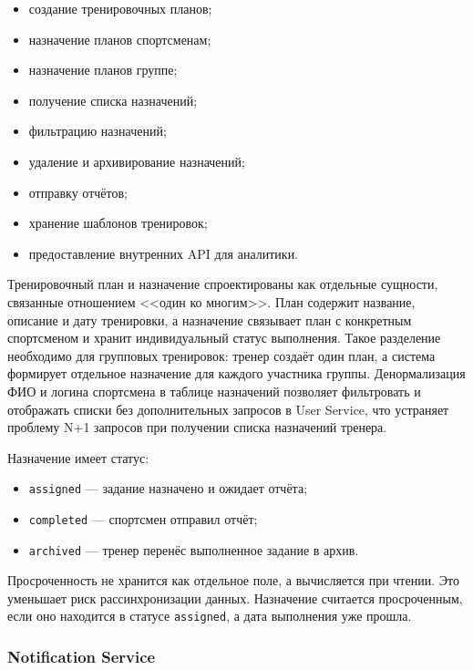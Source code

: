 \begin{itemize}
\tightlist
\item
  создание тренировочных планов;
\item
  назначение планов спортсменам;
\item
  назначение планов группе;
\item
  получение списка назначений;
\item
  фильтрацию назначений;
\item
  удаление и архивирование назначений;
\item
  отправку отчётов;
\item
  хранение шаблонов тренировок;
\item
  предоставление внутренних API для аналитики.
\end{itemize}

Тренировочный план и назначение спроектированы как отдельные сущности, связанные отношением <<один ко многим>>. План содержит название, описание и дату тренировки, а назначение связывает план с конкретным спортсменом и хранит индивидуальный статус выполнения. Такое разделение необходимо для групповых тренировок: тренер создаёт один план, а система формирует отдельное назначение для каждого участника группы. Денормализация ФИО и логина спортсмена в таблице назначений позволяет фильтровать и отображать списки без дополнительных запросов в User Service, что устраняет проблему N+1 запросов при получении списка назначений тренера.

Назначение имеет статус:

\begin{itemize}
\tightlist
\item
  \passthrough{\lstinline!assigned!} --- задание назначено и ожидает отчёта;
\item
  \passthrough{\lstinline!completed!} --- спортсмен отправил отчёт;
\item
  \passthrough{\lstinline!archived!} --- тренер перенёс выполненное задание в архив.
\end{itemize}

Просроченность не хранится как отдельное поле, а вычисляется при чтении. Это уменьшает риск рассинхронизации данных. Назначение считается просроченным, если оно находится в статусе \passthrough{\lstinline!assigned!}, а дата выполнения уже прошла.

\subsubsection{Notification Service}

